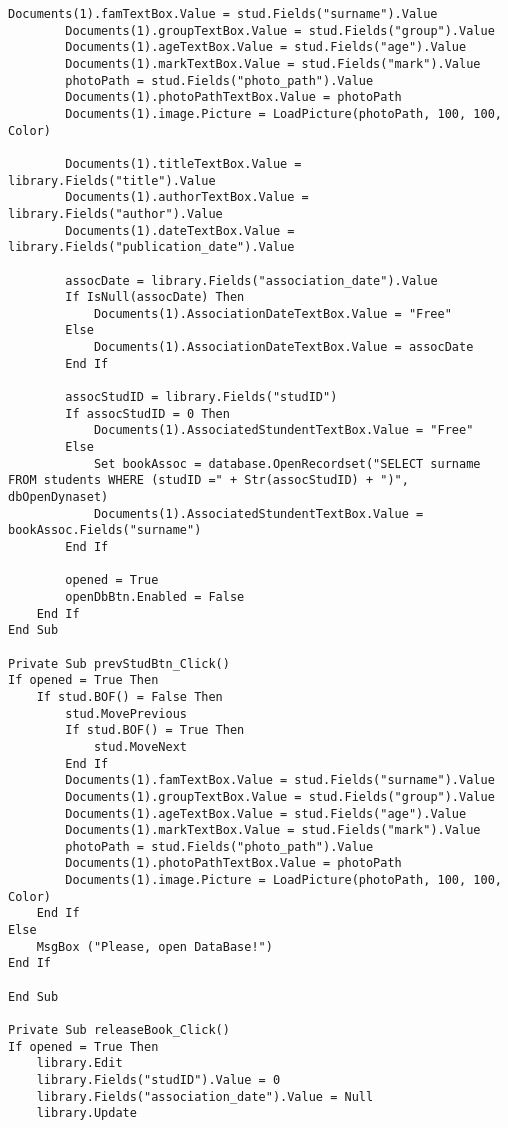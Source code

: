 \begin{lstlisting}[caption=VBA code]
        Documents(1).famTextBox.Value = stud.Fields("surname").Value
        Documents(1).groupTextBox.Value = stud.Fields("group").Value
        Documents(1).ageTextBox.Value = stud.Fields("age").Value
        Documents(1).markTextBox.Value = stud.Fields("mark").Value
        photoPath = stud.Fields("photo_path").Value
        Documents(1).photoPathTextBox.Value = photoPath
        Documents(1).image.Picture = LoadPicture(photoPath, 100, 100, Color)
        
        Documents(1).titleTextBox.Value = library.Fields("title").Value
        Documents(1).authorTextBox.Value = library.Fields("author").Value
        Documents(1).dateTextBox.Value = library.Fields("publication_date").Value
        
        assocDate = library.Fields("association_date").Value
        If IsNull(assocDate) Then
            Documents(1).AssociationDateTextBox.Value = "Free"
        Else
            Documents(1).AssociationDateTextBox.Value = assocDate
        End If
        
        assocStudID = library.Fields("studID")
        If assocStudID = 0 Then
            Documents(1).AssociatedStundentTextBox.Value = "Free"
        Else
            Set bookAssoc = database.OpenRecordset("SELECT surname FROM students WHERE (studID =" + Str(assocStudID) + ")", dbOpenDynaset)
            Documents(1).AssociatedStundentTextBox.Value = bookAssoc.Fields("surname")
        End If
        
        opened = True
        openDbBtn.Enabled = False
    End If
End Sub

Private Sub prevStudBtn_Click() 
If opened = True Then
    If stud.BOF() = False Then
        stud.MovePrevious
        If stud.BOF() = True Then
            stud.MoveNext
        End If
        Documents(1).famTextBox.Value = stud.Fields("surname").Value
        Documents(1).groupTextBox.Value = stud.Fields("group").Value
        Documents(1).ageTextBox.Value = stud.Fields("age").Value
        Documents(1).markTextBox.Value = stud.Fields("mark").Value
        photoPath = stud.Fields("photo_path").Value
        Documents(1).photoPathTextBox.Value = photoPath
        Documents(1).image.Picture = LoadPicture(photoPath, 100, 100, Color)
    End If
Else
    MsgBox ("Please, open DataBase!")
End If

End Sub

Private Sub releaseBook_Click()
If opened = True Then
    library.Edit
    library.Fields("studID").Value = 0
    library.Fields("association_date").Value = Null
    library.Update
    

\end{lstlisting}
